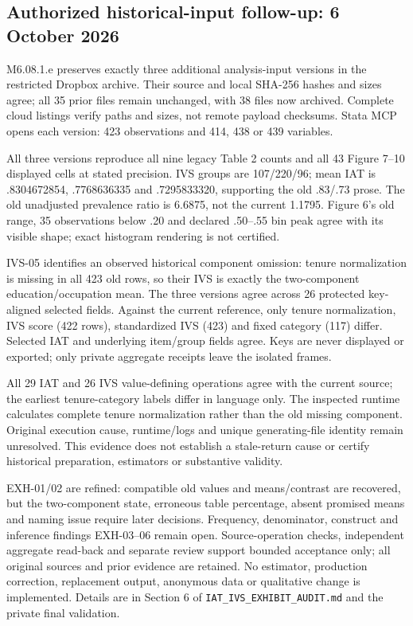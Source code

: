 \documentclass[11pt,a4paper]{article}
\begin{document}
\subsection{Authorized historical-input follow-up: 6 October 2026}
M6.08.1.e preserves exactly three additional analysis-input versions in the
restricted Dropbox archive. Their source and local SHA-256 hashes and sizes
agree; all 35 prior files remain unchanged, with 38 files now archived.
Complete cloud listings verify paths and sizes, not remote payload checksums.
Stata MCP opens each version: 423 observations and 414, 438 or 439 variables.

All three versions reproduce all nine legacy Table 2 counts and all 43
Figure 7--10 displayed cells at stated precision. IVS groups are 107/220/96;
mean IAT is .8304672854, .7768636335 and .7295833320, supporting the old .83/.73
prose. The old unadjusted prevalence ratio is 6.6875, not the current 1.1795.
Figure 6's old range, 35 observations below .20 and declared .50--.55 bin
peak agree with its visible shape; exact histogram rendering is not certified.

IVS-05 identifies an observed historical component omission: tenure
normalization is missing in all 423 old rows, so their IVS is exactly the
two-component education/occupation mean. The three versions agree across 26
protected key-aligned selected fields. Against the current reference, only
tenure normalization, IVS score (422 rows), standardized IVS (423) and fixed
category (117) differ. Selected IAT and underlying item/group fields agree.
Keys are never displayed or exported; only private aggregate receipts leave
the isolated frames.

All 29 IAT and 26 IVS value-defining operations agree with the current source;
the earliest tenure-category labels differ in language only. The inspected
runtime calculates complete tenure normalization rather than the old missing
component. Original execution cause, runtime/logs and unique generating-file
identity remain unresolved. This evidence does not establish a stale-return
cause or certify historical preparation, estimators or substantive validity.

EXH-01/02 are refined: compatible old values and means/contrast are recovered,
but the two-component state, erroneous table percentage, absent promised
means and naming issue require later decisions. Frequency, denominator,
construct and inference findings EXH-03--06 remain open. Source-operation
checks, independent aggregate read-back and separate review support bounded
acceptance only; all original sources and prior evidence are retained.
No estimator, production correction, replacement output, anonymous data or
qualitative change is implemented. Details are in Section 6 of
\texttt{IAT\_IVS\_EXHIBIT\_AUDIT.md} and the private final validation.
\end{document}

